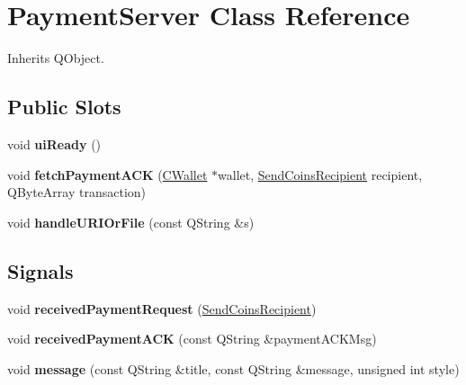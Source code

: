\hypertarget{class_payment_server}{}\section{Payment\+Server Class Reference}
\label{class_payment_server}


Inherits Q\+Object.

\subsection*{Public Slots}
\begin{DoxyCompactItemize}
\item 
\mbox{\label{class_payment_server_abb6c65fabbf97ba95381997ca9cd6993}} 
void {\bfseries ui\+Ready} ()
\item 
\mbox{\label{class_payment_server_ab846f9e8778e5cc878b644133e8628f1}} 
void {\bfseries fetch\+Payment\+A\+CK} (\mbox{\hyperlink{class_c_wallet}{C\+Wallet}} $\ast$wallet, \mbox{\hyperlink{class_send_coins_recipient}{Send\+Coins\+Recipient}} recipient, Q\+Byte\+Array transaction)
\item 
\mbox{\label{class_payment_server_adf4f844b3ce7f053690fd9260210640d}} 
void {\bfseries handle\+U\+R\+I\+Or\+File} (const Q\+String \&s)
\end{DoxyCompactItemize}
\subsection*{Signals}
\begin{DoxyCompactItemize}
\item 
\mbox{\label{class_payment_server_aa8b9cb16623d307e0cdc47de2dfe7e56}} 
void {\bfseries received\+Payment\+Request} (\mbox{\hyperlink{class_send_coins_recipient}{Send\+Coins\+Recipient}})
\item 
\mbox{\label{class_payment_server_a3566aabe525fb1b4a25975d7564abec6}} 
void {\bfseries received\+Payment\+A\+CK} (const Q\+String \&payment\+A\+C\+K\+Msg)
\item 
\mbox{\label{class_payment_server_a5f6427a6b665cbce3cd42f04feb9b183}} 
void {\bfseries message} (const Q\+String \&title, const Q\+String \&message, unsigned int style)
\end{DoxyCompactItemize}
